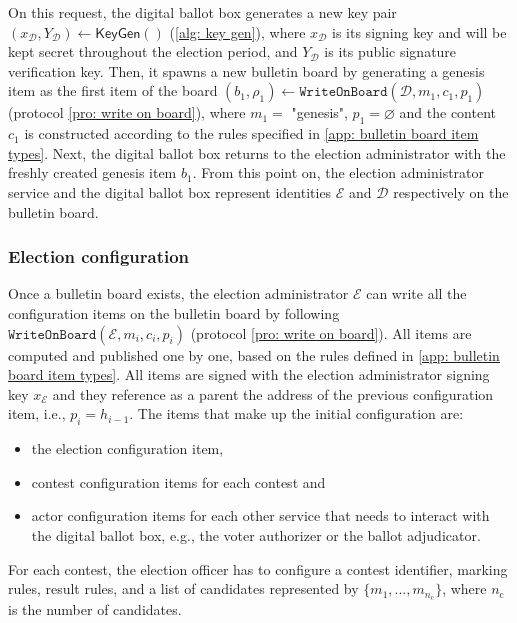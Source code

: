 On this request, the digital ballot box generates a new key pair $(x_\mathcal{D}, Y_\mathcal{D}) \gets \mathsf{KeyGen}()$ (\cref{alg: key gen}), where $x_\mathcal{D}$ is its signing key and will be kept secret throughout the election period, and $Y_\mathcal{D}$ is its public signature verification key. Then, it spawns a new bulletin board by generating a genesis item as the first item of the board $(b_1, \rho_1) \gets \mathtt{WriteOnBoard}(\mathcal{D}, m_1, c_1, p_1)$ (protocol \ref{pro: write on board}), where $m_1 = $ "genesis", $p_1 = \varnothing$ and the content $c_1$ is constructed according to the rules specified in \cref{app: bulletin board item types}. Next, the digital ballot box returns to the election administrator with the freshly created genesis item $b_1$. From this point on, the election administrator service and the digital ballot box represent identities $\mathcal{E}$ and $\mathcal{D}$ respectively on the bulletin board.


\subsubsection{Election configuration} \label{sec: election configuration}
Once a bulletin board exists, the election administrator $\mathcal{E}$ can write all the configuration items on the bulletin board by following $\mathtt{WriteOnBoard}(\mathcal{E}, m_i, c_i, p_i)$ (protocol \ref{pro: write on board}). All items are computed and published one by one, based on the rules defined in \cref{app: bulletin board item types}. All items are signed with the election administrator signing key $x_\mathcal{E}$ and they reference as a parent the address of the previous configuration item, i.e., $p_i = h_{i-1}$. The items that make up the initial configuration are:
\begin{itemize}
    \item the election configuration item,
    \item contest configuration items for each contest and
    \item actor configuration items for each other service that needs to interact with the digital ballot box, e.g., the voter authorizer or the ballot adjudicator.
\end{itemize}

For each contest, the election officer has to configure a contest identifier, marking rules, result rules, and a list of candidates represented by $\{ m_1, ..., m_{n_\mathrm{c}} \}$, where $n_\mathrm{c}$ is the number of candidates.

